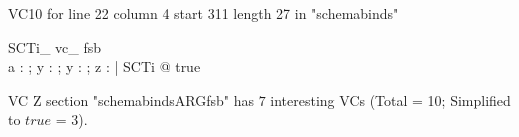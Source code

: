 \documentclass{article}
\begin{document}
VC10 for line 22 column 4 start 311 length 27 in "schemabinds"
\begin{theorem}{ SCTi\_ vc\_ fsb}\\
 \exists a : \nat ; y : \nat ; y : \nat ; z : \power \nat | SCTi @ true \\

\end{theorem}



 VC Z section "schemabindsARGfsb" has $7$ interesting VCs (Total = 10; Simplified to $true$ = 3).



\end{document}
